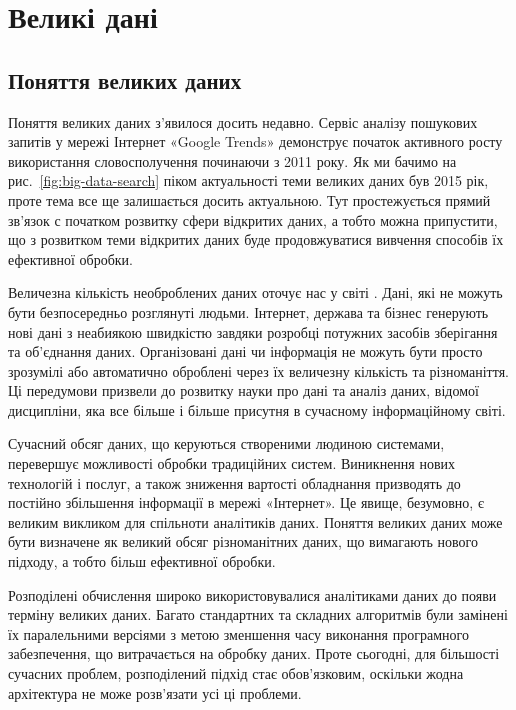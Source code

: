 \chapter{Великі дані}

\section{Поняття великих даних}

Поняття великих даних з'явилося досить недавно.
Сервіс аналізу пошукових запитів у мережі Інтернет «Google Trends» демонструє початок активного росту
використання словосполучення починаючи з 2011 року.
Як ми бачимо на рис.~\ref{fig:big-data-search} піком актуальності теми великих даних був 2015 рік, проте
тема все ще залишається досить актуальною.
Тут простежується прямий зв'язок с початком розвитку сфери відкритих даних,
а тобто можна припустити, що з розвитком теми відкритих даних буде продовжуватися вивчення способів їх ефективної обробки.

Величезна кількість необроблених даних оточує нас у  світі \cite{BigDataFundamentals}.
Дані, які не можуть бути безпосередньо розглянуті людьми.
Інтернет, держава та бізнес генерують нові дані з неабиякою
швидкістю завдяки розробці потужних засобів зберігання та об'єднання
даних. Організовані дані чи інформація не можуть бути просто зрозумілі
або автоматично оброблені через їх величезну кількість та різноманіття.
Ці передумови призвели до розвитку науки про дані та
аналіз даних, відомої дисципліни, яка все більше і більше присутня в
сучасному інформаційному світі.

Сучасний обсяг даних, що керуються створеними людиною системами,
перевершує можливості обробки традиційних систем.
Виникнення нових технологій і послуг, а також зниження вартості обладнання призводять до постійно збільшення інформації в мережі «Інтернет».
Це явище, безумовно, є великим викликом для спільноти аналітиків даних.
Поняття великих даних може бути визначене як великий обсяг різноманітних даних, що вимагають нового підходу, а тобто більш ефективної обробки.

Розподілені обчислення широко використовувалися аналітиками даних до появи терміну великих даних.
Багато стандартних та складних алгоритмів були замінені їх паралельними версіями з метою зменшення
часу виконання програмного забезпечення, що витрачається на обробку даних.
Проте сьогодні, для більшості сучасних проблем, розподілений підхід стає обов'язковим, оскільки
жодна архітектура не може розв'язати усі ці проблеми.

